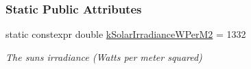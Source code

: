 \subsubsection*{Static Public Attributes}
\begin{DoxyCompactItemize}
\item 
\mbox{\label{classosse_1_1collaborate_1_1_solar_panel_a955f766fe850b04209aa6878473dbd5e}} 
static constexpr double \hyperlink{classosse_1_1collaborate_1_1_solar_panel_a955f766fe850b04209aa6878473dbd5e}{k\+Solar\+Irradiance\+W\+Per\+M2} = 1332
\begin{DoxyCompactList}\small\item\em The sun\textquotesingle{}s irradiance (Watts per meter squared) \end{DoxyCompactList}\end{DoxyCompactItemize}
